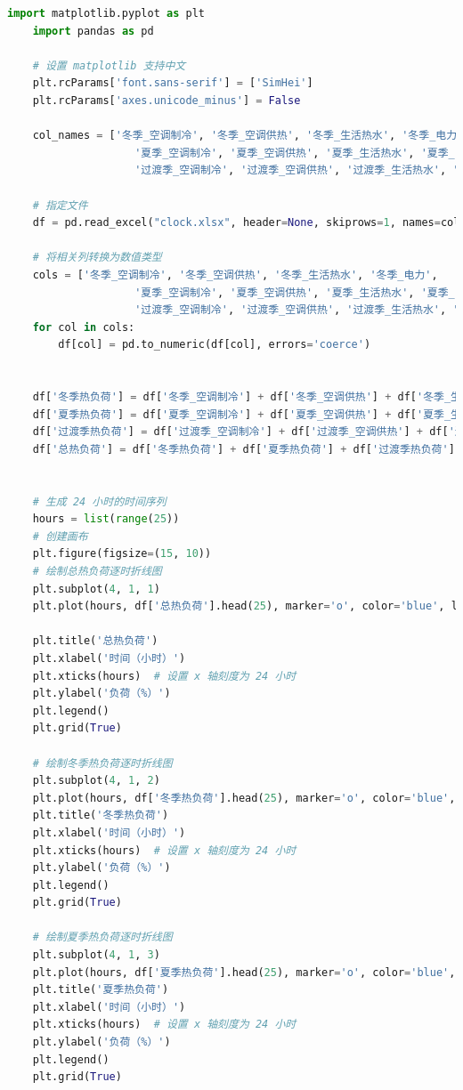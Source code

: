 \documentclass[UTF8]{ctexart}
\begin{document}
\begin{lstlisting}[language=Python]
    import matplotlib.pyplot as plt
    import pandas as pd
    
    # 设置 matplotlib 支持中文
    plt.rcParams['font.sans-serif'] = ['SimHei']
    plt.rcParams['axes.unicode_minus'] = False
    
    col_names = ['冬季_空调制冷', '冬季_空调供热', '冬季_生活热水', '冬季_电力', 
                    '夏季_空调制冷', '夏季_空调供热', '夏季_生活热水', '夏季_电力', 
                    '过渡季_空调制冷', '过渡季_空调供热', '过渡季_生活热水', '过渡季_电力']
    
    # 指定文件
    df = pd.read_excel("clock.xlsx", header=None, skiprows=1, names=col_names)  
    
    # 将相关列转换为数值类型
    cols = ['冬季_空调制冷', '冬季_空调供热', '冬季_生活热水', '冬季_电力', 
                    '夏季_空调制冷', '夏季_空调供热', '夏季_生活热水', '夏季_电力', 
                    '过渡季_空调制冷', '过渡季_空调供热', '过渡季_生活热水', '过渡季_电力']
    for col in cols:
        df[col] = pd.to_numeric(df[col], errors='coerce')
    
    
    df['冬季热负荷'] = df['冬季_空调制冷'] + df['冬季_空调供热'] + df['冬季_生活热水'] + df['冬季_电力']
    df['夏季热负荷'] = df['夏季_空调制冷'] + df['夏季_空调供热'] + df['夏季_生活热水'] + df['夏季_电力']
    df['过渡季热负荷'] = df['过渡季_空调制冷'] + df['过渡季_空调供热'] + df['过渡季_生活热水'] + df['过渡季_电力']
    df['总热负荷'] = df['冬季热负荷'] + df['夏季热负荷'] + df['过渡季热负荷']
    
    
    # 生成 24 小时的时间序列
    hours = list(range(25))
    # 创建画布
    plt.figure(figsize=(15, 10))
    # 绘制总热负荷逐时折线图
    plt.subplot(4, 1, 1)
    plt.plot(hours, df['总热负荷'].head(25), marker='o', color='blue', label='总热负荷')
    
    plt.title('总热负荷')
    plt.xlabel('时间（小时）')
    plt.xticks(hours)  # 设置 x 轴刻度为 24 小时
    plt.ylabel('负荷（%）')
    plt.legend()
    plt.grid(True)
    
    # 绘制冬季热负荷逐时折线图
    plt.subplot(4, 1, 2)
    plt.plot(hours, df['冬季热负荷'].head(25), marker='o', color='blue', label='冬季热负荷')
    plt.title('冬季热负荷')
    plt.xlabel('时间（小时）')
    plt.xticks(hours)  # 设置 x 轴刻度为 24 小时
    plt.ylabel('负荷（%）')
    plt.legend()
    plt.grid(True)
    
    # 绘制夏季热负荷逐时折线图
    plt.subplot(4, 1, 3)
    plt.plot(hours, df['夏季热负荷'].head(25), marker='o', color='blue', label='夏季热负荷')
    plt.title('夏季热负荷')
    plt.xlabel('时间（小时）')
    plt.xticks(hours)  # 设置 x 轴刻度为 24 小时
    plt.ylabel('负荷（%）')
    plt.legend()
    plt.grid(True)
    

\end{lstlisting}
\end{document}
